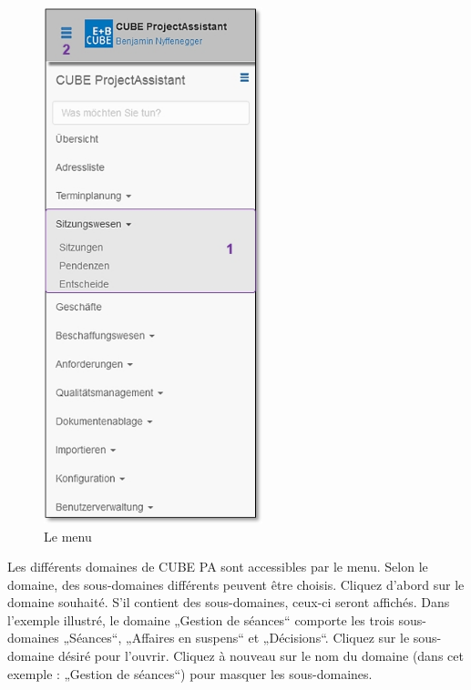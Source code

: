 \begin{figure}   %
  \vspace{-25pt}      %
  \begin{center}
    \includegraphics[height=150mm]{../chapters/01_Einfuehrung/pictures/1-3-1_Menuuebersicht_oSitzungswesen.jpg}
  \end{center}
  \vspace{-20pt}
  \caption{Le menu}
  \vspace{-10pt}
\end{figure}

Les différents domaines de CUBE PA sont accessibles par le menu. Selon le domaine, des sous-domaines différents peuvent être choisis. Cliquez d'abord sur le domaine souhaité. S'il contient des sous-domaines, ceux-ci seront affichés. Dans l'exemple illustré, le domaine „Gestion de séances“  comporte les trois sous-domaines „Séances“, „Affaires en suspens“ et „Décisions“. Cliquez sur le sous-domaine désiré pour l'ouvrir. Cliquez à nouveau sur le nom du domaine (dans cet exemple : „Gestion de séances“) pour masquer les sous-domaines. 

